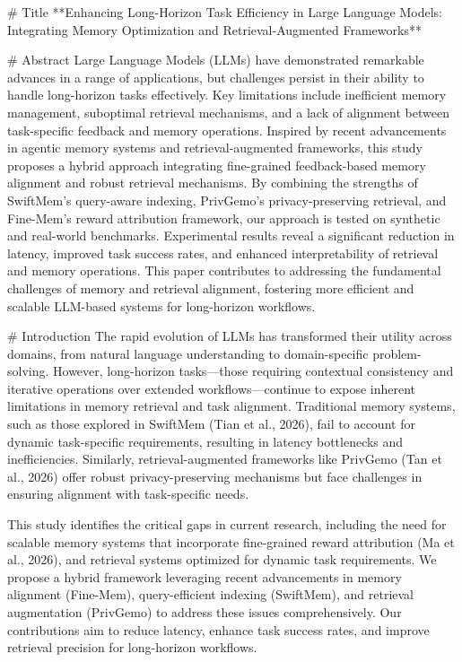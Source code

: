 # Title  
**Enhancing Long-Horizon Task Efficiency in Large Language Models: Integrating Memory Optimization and Retrieval-Augmented Frameworks**

# Abstract  
Large Language Models (LLMs) have demonstrated remarkable advances in a range of applications, but challenges persist in their ability to handle long-horizon tasks effectively. Key limitations include inefficient memory management, suboptimal retrieval mechanisms, and a lack of alignment between task-specific feedback and memory operations. Inspired by recent advancements in agentic memory systems and retrieval-augmented frameworks, this study proposes a hybrid approach integrating fine-grained feedback-based memory alignment and robust retrieval mechanisms. By combining the strengths of SwiftMem’s query-aware indexing, PrivGemo’s privacy-preserving retrieval, and Fine-Mem’s reward attribution framework, our approach is tested on synthetic and real-world benchmarks. Experimental results reveal a significant reduction in latency, improved task success rates, and enhanced interpretability of retrieval and memory operations. This paper contributes to addressing the fundamental challenges of memory and retrieval alignment, fostering more efficient and scalable LLM-based systems for long-horizon workflows.

# Introduction  
The rapid evolution of LLMs has transformed their utility across domains, from natural language understanding to domain-specific problem-solving. However, long-horizon tasks—those requiring contextual consistency and iterative operations over extended workflows—continue to expose inherent limitations in memory retrieval and task alignment. Traditional memory systems, such as those explored in SwiftMem (Tian et al., 2026), fail to account for dynamic task-specific requirements, resulting in latency bottlenecks and inefficiencies. Similarly, retrieval-augmented frameworks like PrivGemo (Tan et al., 2026) offer robust privacy-preserving mechanisms but face challenges in ensuring alignment with task-specific needs.  

This study identifies the critical gaps in current research, including the need for scalable memory systems that incorporate fine-grained reward attribution (Ma et al., 2026), and retrieval systems optimized for dynamic task requirements. We propose a hybrid framework leveraging recent advancements in memory alignment (Fine-Mem), query-efficient indexing (SwiftMem), and retrieval augmentation (PrivGemo) to address these issues comprehensively. Our contributions aim to reduce latency, enhance task success rates, and improve retrieval precision for long-horizon workflows.

